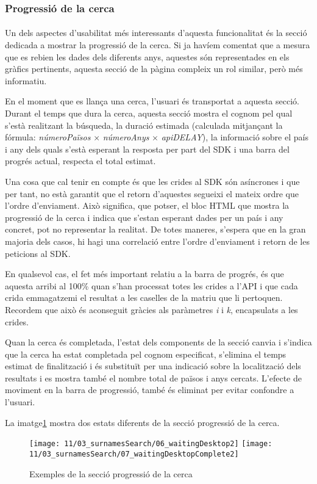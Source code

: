 \subsubsection{Progressió de la cerca}

\paragraph{}
Un dels aspectes d'usabilitat més interessants d'aquesta funcionalitat és la secció dedicada a mostrar la progressió de la cerca. Si ja havíem comentat que a mesura que es rebien les dades dels diferents anys, aquestes són representades en els gràfics pertinents, aquesta secció de la pàgina compleix un rol similar, però més informatiu.

En el moment que es llança una cerca, l'usuari és transportat a aquesta secció. Durant el temps que dura la cerca, aquesta secció mostra el cognom pel qual s'està realitzant la búsqueda, la duració estimada (calculada mitjançant la fórmula: \emph{númeroPaïsos} $\times$ \emph{númeroAnys} $\times$ \emph{apiDELAY}), la informació sobre el país i any dels quals s'està esperant la resposta per part del SDK i una barra del progrés actual, respecta el total estimat.

Una cosa que cal tenir en compte és que les crides al SDK són asíncrones i que per tant, no està garantit que el retorn d'aquestes segueixi el mateix ordre que l'ordre d'enviament. Això significa, que potser, el bloc HTML que mostra la progressió de la cerca i indica que s’estan esperant dades per un país i any concret, pot no representar la realitat. De totes maneres, s’espera que en la gran majoria dels casos, hi hagi una correlació entre l’ordre d’enviament i retorn de les peticions al SDK.

En qualsevol cas, el fet més important relatiu a la barra de progrés, és que aquesta arribi al 100\% quan s'han processat totes les crides a l’API i que cada crida emmagatzemi el resultat a les caselles de la matriu que li pertoquen. Recordem que això és aconseguit gràcies als paràmetres \emph{i} i \emph{k}, encapsulats a les crides.

Quan la cerca és completada, l'estat dels components de la secció canvia i s'indica que la cerca ha estat completada pel cognom especificat, s'elimina el temps estimat de finalització i és substituït per una indicació sobre la localització dels resultats i es mostra també el nombre total de països i anys cercats. L'efecte de moviment en la barra de progressió, també és eliminat per evitar confondre a l'usuari.

La imatge\ref{fig:waitingSurnames} mostra dos estats diferents de la secció progressió de la cerca.

\begin{figure}[h]
    \texttt{[image: 11/03\_surnamesSearch/06\_waitingDesktop2]}
    \texttt{[image: 11/03\_surnamesSearch/07\_waitingDesktopComplete2]}
    \centering
    \caption{Exemples de la secció progressió de la cerca}\label{fig:waitingSurnames}
\end{figure}
